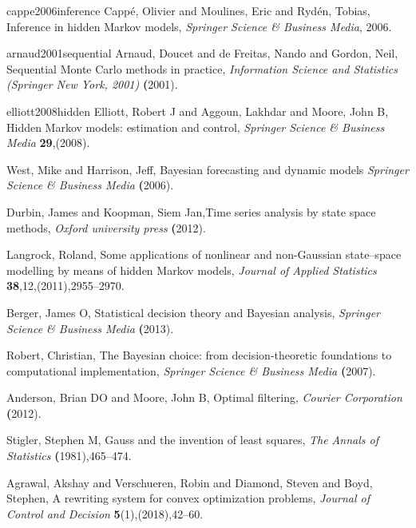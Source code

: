 \documentclass[mstat,12pt]{unswthesis}  %
\numberwithin{equation}{section}
\begin{document}
\begin{thebibliography}{999}

\bibitem
{cappe2006inference} Capp{\'e}, Olivier and Moulines, Eric and Ryd{\'e}n, Tobias, Inference in hidden Markov models, 
\textit{Springer Science \& Business Media}, 2006.

\bibitem
{arnaud2001sequential} Arnaud, Doucet and de Freitas, Nando and Gordon, Neil, Sequential Monte Carlo methods in practice,
\textit {Information Science and Statistics (Springer New York, 2001)} 
\textbf(2001).

\bibitem
{elliott2008hidden}  Elliott, Robert J and Aggoun, Lakhdar and Moore, John B, Hidden Markov models: estimation and control,
\textit{Springer Science \& Business Media}
\textbf {29},(2008).
  
 West, Mike and Harrison, Jeff, Bayesian forecasting and dynamic models
\textit{Springer Science \& Business Media}
\textbf(2006).

 Durbin, James and Koopman, Siem Jan,Time series analysis by state space methods,
\textit{Oxford university press}
\textbf(2012).

 Langrock, Roland, Some applications of nonlinear and non-Gaussian state--space modelling by means of hidden Markov models,
\textit{Journal of Applied Statistics}
\textbf{38},{12},(2011),2955--2970.

 Berger, James O, Statistical decision theory and Bayesian analysis,
\textit{Springer Science \& Business Media}
\textbf(2013).


 Robert, Christian, The Bayesian choice: from decision-theoretic foundations to computational implementation,
\textit {Springer Science \& Business Media}
\textbf(2007).

 Anderson, Brian DO and Moore, John B, Optimal filtering,
\textit{Courier Corporation} 
\textbf(2012).

 Stigler, Stephen M, Gauss and the invention of least squares,
\textit{The Annals of Statistics}
\textbf(1981),465--474.

 Agrawal, Akshay and Verschueren, Robin and Diamond, Steven and Boyd, Stephen, A rewriting system for convex optimization problems,
\textit{Journal of Control and Decision}
\textbf {5}(1),(2018),42--60.




\end{thebibliography}
\end{document}

